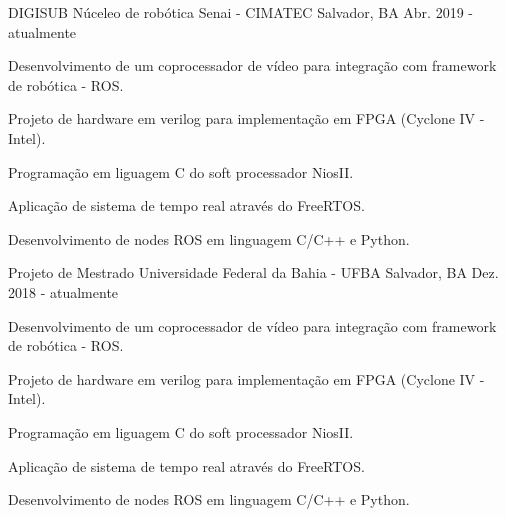

\begin{cventries}

  \cventry
    {DIGISUB} %
    {Núceleo de robótica Senai - CIMATEC} %
    {Salvador, BA} %
    {Abr. 2019 - atualmente} %
    {
      \begin{cvitems} %
        \item {Desenvolvimento de um coprocessador de vídeo para integração com framework de robótica - ROS.}
        \item {Projeto de hardware em verilog para implementação em FPGA (Cyclone IV - Intel).}
        \item {Programação em liguagem C do soft processador NiosII.}
        \item {Aplicação de sistema de tempo real através do FreeRTOS.}
        \item {Desenvolvimento de nodes ROS em linguagem C/C++ e Python.}
      \end{cvitems}
    }


  \cventry
    {Projeto de Mestrado} %
    {Universidade Federal da Bahia - UFBA} %
    {Salvador, BA} %
    {Dez. 2018 - atualmente} %
    {
      \begin{cvitems} %
        \item {Desenvolvimento de um coprocessador de vídeo para integração com framework de robótica - ROS.}
        \item {Projeto de hardware em verilog para implementação em FPGA (Cyclone IV - Intel).}
        \item {Programação em liguagem C do soft processador NiosII.}
        \item {Aplicação de sistema de tempo real através do FreeRTOS.}
        \item {Desenvolvimento de nodes ROS em linguagem C/C++ e Python.}
      \end{cvitems}
    }


\end{cventries}
